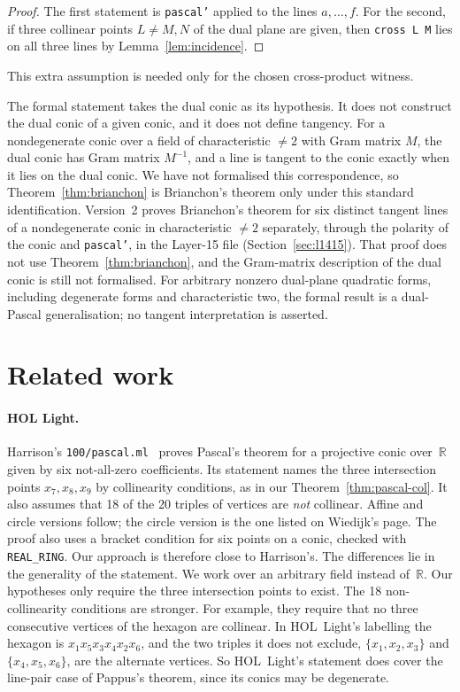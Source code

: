 \documentclass[11pt]{article}
\theoremstyle{remark}
\newcommand{\lean}[1]{\texttt{#1}}
\begin{document}
\begin{proof}
The first statement is \lean{pascal'} applied to the lines $a,\dots,f$. For the second, if three
collinear points $L\ne M, N$ of the dual plane are given, then \lean{cross L M} lies on all three
lines by Lemma~\ref{lem:incidence}.
\end{proof}

This extra assumption is needed only for the chosen cross-product witness.

The formal statement takes the dual conic as its hypothesis. It does not construct the dual conic
of a given conic, and it does not define tangency. For a nondegenerate conic over a field of
characteristic $\ne2$ with Gram matrix $M$, the dual conic has Gram matrix $M^{-1}$, and a line is
tangent to the conic exactly when it lies on the dual conic. We have not formalised this
correspondence, so Theorem~\ref{thm:brianchon} is Brianchon's theorem only under this standard
identification. Version~2 proves Brianchon's theorem for six distinct tangent lines of a
nondegenerate conic in characteristic $\ne2$ separately, through the polarity of the conic and
\lean{pascal'}, in the Layer-15 file (Section~\ref{sec:l1415}). That proof does not use
Theorem~\ref{thm:brianchon}, and the Gram-matrix description of the dual conic is still not
formalised. For arbitrary nonzero dual-plane quadratic forms, including degenerate forms and characteristic
two, the formal result is a dual-Pascal generalisation; no tangent interpretation is asserted.

\section{Related work}\label{sec:related}

\paragraph{HOL Light.} Harrison's \texttt{100/pascal.ml}~\cite{HOLLight} proves Pascal's theorem
for a projective conic over~$\mathbb{R}$ given by six not-all-zero coefficients. Its statement
names the three intersection points $x_7,x_8,x_9$ by collinearity conditions, as in our
Theorem~\ref{thm:pascal-col}. It also assumes that 18 of the 20 triples of vertices are \emph{not} collinear. Affine and circle versions follow; the circle version is the one listed
on Wiedijk's page. The proof also uses a bracket condition for six points on a conic, checked with
\texttt{REAL\_RING}. Our approach is therefore close to Harrison's. The differences lie in the
generality of the statement. We work over an arbitrary field instead of~$\mathbb{R}$. Our
hypotheses only require the three intersection points to exist. The 18 non-collinearity
conditions are stronger. For example, they require that no three consecutive vertices of the
hexagon are collinear. In HOL~Light's labelling the hexagon is $x_1x_5x_3x_4x_2x_6$, and the two
triples it does not exclude, $\{x_1,x_2,x_3\}$ and $\{x_4,x_5,x_6\}$, are the alternate
vertices. So HOL~Light's statement does cover the line-pair case of Pappus's theorem, since its
conics may be degenerate.
\end{document}
